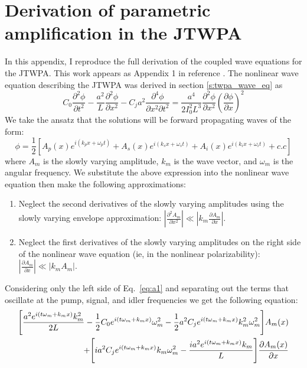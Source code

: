 \chapter{Derivation of parametric amplification in the JTWPA}
\label{a:twpa_paramp}

In this appendix, I reproduce the full derivation of the coupled wave equations for the JTWPA.  This work appears as Appendix 1 in reference \cite{OBrien2014}.  The nonlinear wave equation describing the JTWPA was derived in section \ref{s:twpa_wave_eq} as
\begin{equation}
{C_0}\frac{{{\partial ^2}\phi }}{{\partial {t^2}}} - \frac{{{a^2}}}{L}\frac{{{\partial ^2}\phi }}{{\partial {x^2}}} - {C_j}{a^2}\frac{{{\partial ^4}\phi }}{{\partial {x^2}\partial {t^2}}} = \frac{{{a^4}}}{{2I_0^2{L^3}}}\frac{{{\partial ^2}\phi }}{{\partial {x^2}}}{\left( {\frac{{\partial \phi }}{{\partial x}}} \right)^2} \label{eq:a1}
\end{equation}
We take the ansatz that the solutions will be forward propagating waves of the form:
\begin{equation}
\phi  = \frac{1}{2} [ A_p(x)e^{i(k_p x + \omega _p t)} + A_s(x)e^{i(k_s x + \omega _s t)} +A_i(x)e^{i(k_ix + \omega _it)} + c.c]
\end{equation}
where $A_m$ is the slowly varying amplitude, $k_m$ is the wave vector, and $\omega_m$ is the angular frequency. We substitute the above expression into the nonlinear wave equation then make the following approximations: 
\begin{enumerate}
\item	Neglect the second derivatives of the slowly varying amplitudes using the slowly varying envelope approximation: $\left| {\frac{{{\partial ^2}{A_m}}}{{\partial {x^2}}}} \right| \ll \left| {{k_m}\frac{{\partial {A_m}}}{{\partial x}}} \right|$.
\item	Neglect the first derivatives of the slowly varying amplitudes on the right side of the nonlinear wave equation (ie, in the nonlinear polarizability): $\left| {\frac{{\partial {A_m}}}{{\partial x}}} \right| \ll \left| {{k_m}{A_m}} \right|$.  
\end{enumerate}
Considering only the left side of Eq.~\ref{eq:a1} and separating out the terms that oscillate at the pump, signal, and idler frequencies we get the following equation:
\begin{align}
\Biggl[ \frac{a^2 e^{i(t\omega_m + k_m x)} k_m^2}{2L} - 
\frac{1}{2} C_0 e^{i(t\omega _m + k_m x)}\omega _m^2 - \frac{1}{2} a^2 C_j e^{i(t\omega _m + k_m x)}k_m^2 \omega _m^2 \Biggr] A_m(x)  \notag \\
+ \Biggl[ i a^2 C_j e^{i(t\omega _m + k_m x)}k_m \omega _m^2 -
\frac{i a^2 e^{i(t\omega _m + k_m x)} k_m}{L}  \Biggr] \frac{\partial A_m(x)}{\partial x} \label{eq:a2}
\end{align}

